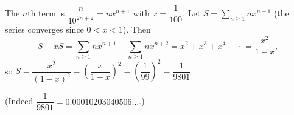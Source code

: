 The $n$th term is $\dfrac{n}{10^{2n+2}}=nx^{n+1}$ with $x=\dfrac1{100}$. Let $S=\sum_{n\ge1}nx^{n+1}$ (the series converges since $0<x<1$). Then
\[S-xS=\sum_{n\ge1}nx^{n+1}-\sum_{n\ge1}nx^{n+2}=x^2+x^3+x^4+\cdots=\dfrac{x^2}{1-x},\]
so $S=\dfrac{x^2}{(1-x)^2}=\left(\dfrac{x}{1-x}\right)^2=\left(\dfrac{1}{99}\right)^2=\boxed{\dfrac{1}{9801}}$.

(Indeed $\dfrac1{9801}=0.00010203040506\ldots$.)
